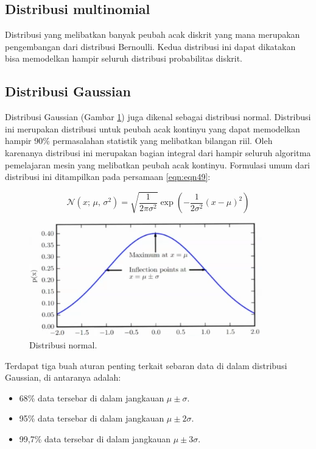 \subsection{Distribusi multinomial}
Distribusi yang melibatkan banyak peubah acak diskrit yang mana merupakan pengembangan dari distribusi Bernoulli. Kedua distribusi ini dapat dikatakan bisa memodelkan hampir seluruh distribusi probabilitas diskrit.

\subsection{Distribusi Gaussian}
Distribusi Gaussian (Gambar \ref{fig:fig12}) juga dikenal sebagai distribusi normal. Distribusi ini merupakan distribusi untuk peubah acak kontinyu yang dapat memodelkan hampir 90\% permasalahan statistik yang melibatkan bilangan riil. Oleh karenanya distribusi ini merupakan bagian integral dari hampir seluruh algoritma pemelajaran mesin yang melibatkan peubah acak kontinyu. Formulasi umum dari distribusi ini ditampilkan pada persamaan \ref{eqn:eqn49}:

\begin{equation}
    \mathcal{N}(x;\,\mu,\,\sigma^{2}) = \sqrt{\frac{1}{2\pi \sigma^2}} \exp{\left(-\frac{1}{2\sigma^2} (x-\mu)^2\right)}
    \label{eqn:eqn49}
\end{equation}

\begin{figure}[H]
    \centering
    \includegraphics[width=0.9\textwidth]{gambar/gmb12.png}
    \caption{Distribusi normal.}
    \label{fig:fig12}
\end{figure}

Terdapat tiga buah aturan penting terkait sebaran data di dalam distribusi Gaussian, di antaranya adalah:
\begin{itemize}
    \item 68\% data tersebar di dalam jangkauan $\mu \pm{} \sigma$.
    \item 95\% data tersebar di dalam jangkauan $\mu \pm{} 2\sigma$.
    \item 99,7\% data tersebar di dalam jangkauan $\mu \pm{} 3\sigma$.
\end{itemize}

